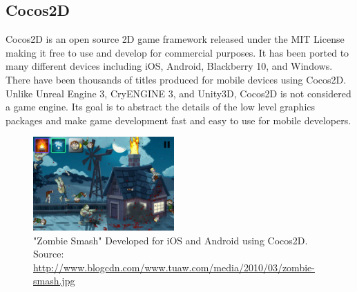 \subsection{Cocos2D}
Cocos2D is an open source 2D game framework released under the MIT License making it free to use and develop for commercial purposes. It has been ported to many different devices including iOS, Android, Blackberry 10, and Windows. There have been thousands of titles produced for mobile devices using Cocos2D.  Unlike Unreal Engine 3, CryENGINE 3, and Unity3D, Cocos2D is not considered a game engine. Its goal is to abstract the details of the low level graphics packages and make game development fast and easy to use for mobile developers. 
\begin{figure}[h!]
  \centering \includegraphics[width=0.48\textwidth]{Images/zombie-smash-screenshot.jpg}
	\caption{"Zombie Smash" Developed for iOS and Android using Cocos2D. Source: \url{http://www.blogcdn.com/www.tuaw.com/media/2010/03/zombie-smash.jpg}}
\end{figure}
